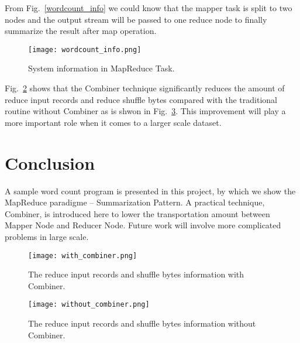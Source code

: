 \documentclass[10pt,twocolumn,letterpaper]{article}
\begin{document}
    From Fig.~\ref{wordcount_info} we could know that the mapper task is 
    split to two nodes and the output stream will be passed to one reduce 
    node to finally summarize the result after map operation.
    \begin{figure}[t]
        \begin{center}
           \texttt{[image: wordcount\_info.png]}
        \end{center}
           \caption{System information in MapReduce Task.}
        \label{wordcount_info}
        \label{fig:long}
        \label{fig:onecol}
    \end{figure}

    Fig.~\ref{with_combiner} shows that the Combiner technique significantly
    reduces the amount of reduce input records and reduce shuffle bytes compared
    with the traditional routine without Combiner as is shwon in Fig.~\ref{without_combiner}.
    This improvement will play a more important role when it comes to a larger scale
    dataset.

    \section{Conclusion}
    A sample word count program is presented in this project, by which we show the
     MapReduce paradigme -- Summarization Pattern. A practical technique, 
    Combiner, is introduced here to lower the transportation amount between 
    Mapper Node and Reducer Node. Future work will involve more complicated problems
    in large scale.
    \begin{figure}[t]
        \begin{center}
           \texttt{[image: with\_combiner.png]}
        \end{center}
           \caption{The reduce input records and shuffle bytes information with Combiner.}
        \label{fig:long}
        \label{fig:onecol}
        \label{with_combiner}
    \end{figure}    
    \begin{figure}[t]
        \begin{center}
           \texttt{[image: without\_combiner.png]}
        \end{center}
           \caption{The reduce input records and shuffle bytes information without Combiner.}
        \label{fig:long}
        \label{fig:onecol}
        \label{without_combiner}
    \end{figure}    
    
\end{document}
